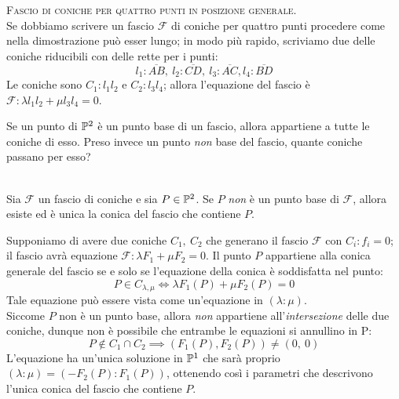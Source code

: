 \begin{tips} \textsc{Fascio di coniche per quattro punti in posizione generale}. \label{fascio coniche per 4 pt pos gen} \\
	Se dobbiamo scrivere un fascio $\mathcal{F}$ di coniche per quattro punti procedere come nella dimostrazione può esser lungo; in modo più rapido, scriviamo due delle coniche riducibili con delle rette per i punti:
	\begin{equation*}
		l_1\colon\overline{AB},\ l_2\colon \overline{CD},\ l_3\colon\overline{AC}, l_4\colon \overline{BD}
	\end{equation*}
	Le coniche sono $C_1\colon l_1l_2$ e $C_2\colon l_3l_4$; allora l'equazione del fascio è $\mathcal{F}\colon \lambda l_1 l_2 + \mu l_3 l_4 =0$.
\end{tips}
Se un punto di $\proj[2]{\ }$ è un punto base di un fascio, allora appartiene a tutte le coniche di esso. Preso invece un punto \textit{non} base del fascio, quante coniche passano per esso?
\begin{proposition}~{}\\
	Sia $\mathcal{F}$ un fascio di coniche e sia $P\in \proj[2]{\ }$. Se $P$ \textit{non} è un punto base di $\mathcal{F}$, allora esiste ed è unica la conica del fascio che contiene $P$.
\end{proposition}
\begin{demonstration}
	Supponiamo di avere due coniche $C_1,\ C_2$ che generano il fascio $\mathcal{F}$ con $C_i\colon f_i=0$; il fascio avrà equazione $\mathcal{F}\colon \lambda F_1 +\mu F_2=0$. Il punto $P$ appartiene alla conica generale del fascio se e solo se l'equazione della conica è soddisfatta nel punto:
		\begin{equation*}
			P\in C_{\lambda,\mu} \iff \lambda F_1\left(P\right) +\mu F_2\left(P\right)=0
		\end{equation*}
	Tale equazione può essere vista come un'equazione in $(\lambda \colon \mu)$.\\
	Siccome $P$ non è un punto base, allora \textit{non} appartiene all'\textit{intersezione} delle due coniche, dunque non è possibile che entrambe le equazioni si annullino in P:
	\begin{equation*}
		P\notin C_1\cap C_2 \implies (F_1\left(P\right), F_2\left(P\right)) \neq \left(0,\ 0\right)
	\end{equation*}
	L'equazione ha un'unica soluzione in $\proj[1]{\ }$ che sarà proprio $(\lambda \colon \mu)=(-F_2\left(P\right)\colon F_1\left(P\right))$, ottenendo così i parametri che descrivono l'unica conica del fascio che contiene $P$.
\end{demonstration}
